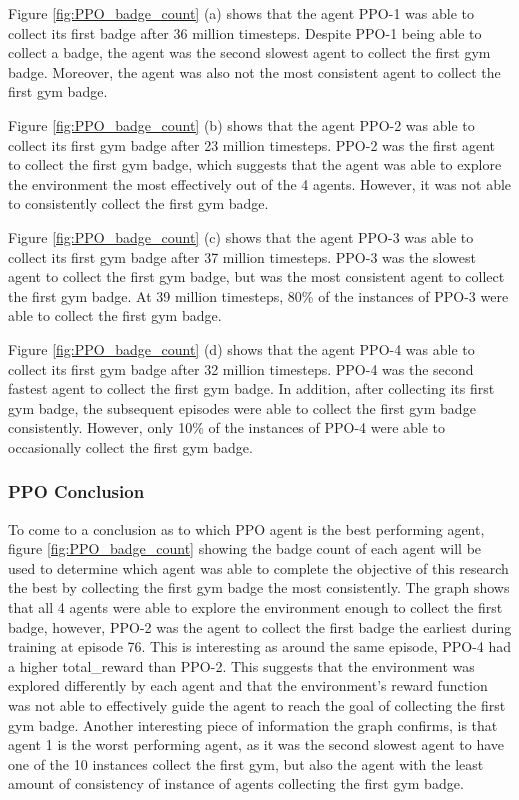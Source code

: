 Figure \ref{fig:PPO_badge_count} (a) shows that the agent PPO-1 was able to collect its first badge after 36 million timesteps. Despite PPO-1 being able to collect a badge, the agent was the second slowest agent to collect the first gym badge. Moreover, the agent was also not the most consistent agent to collect the first gym badge.

Figure \ref{fig:PPO_badge_count} (b) shows that the agent PPO-2 was able to collect its first gym badge after 23 million timesteps. PPO-2 was the first agent to collect the first gym badge, which suggests that the agent was able to explore the environment the most effectively out of the 4 agents. However, it was not able to consistently collect the first gym badge.

Figure \ref{fig:PPO_badge_count} (c) shows that the agent PPO-3 was able to collect its first gym badge after 37 million timesteps. PPO-3 was the slowest agent to collect the first gym badge, but was the most consistent agent to collect the first gym badge. At 39 million timesteps, 80\% of the instances of PPO-3 were able to collect the first gym badge.

Figure \ref{fig:PPO_badge_count} (d) shows that the agent PPO-4 was able to collect its first gym badge after 32 million timesteps. PPO-4 was the second fastest agent to collect the first gym badge. In addition, after collecting its first gym badge, the subsequent episodes were able to collect the first gym badge consistently. However, only 10\% of the instances of PPO-4 were able to occasionally collect the first gym badge.

\subsubsection{PPO Conclusion} 

To come to a conclusion as to which PPO agent is the best performing agent, figure \ref{fig:PPO_badge_count} showing the badge count of each agent will be used to determine which agent was able to complete the objective of this research the best by collecting the first gym badge the most consistently. The graph shows that all 4 agents were able to explore the environment enough to collect the first badge, however, PPO-2 was the agent to collect the first badge the earliest during training at episode 76. This is interesting as around the same episode, PPO-4 had a higher total\_reward than PPO-2. This suggests that the environment was explored differently by each agent and that the environment's reward function was not able to effectively guide the agent to reach the goal of collecting the first gym badge. Another interesting piece of information the graph confirms, is that agent 1 is the worst performing agent, as it was the second slowest agent to have one of the 10 instances collect the first gym, but also the agent with the least amount of consistency of instance of agents collecting the first gym badge. 

